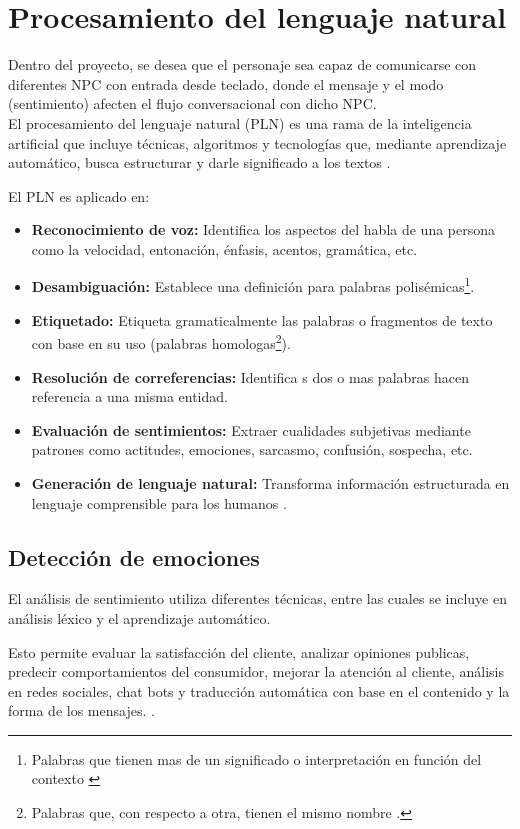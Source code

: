 \documentclass[12pt,twoside]{article}
\begin{document}
	\section{Procesamiento del lenguaje natural}
	Dentro del proyecto, se desea que el personaje sea capaz de comunicarse con diferentes NPC con entrada desde teclado, donde el mensaje y el modo (sentimiento) afecten el flujo conversacional con dicho NPC. \\
	
	El procesamiento del lenguaje natural (PLN) es una rama de la inteligencia artificial que incluye técnicas, algoritmos y tecnologías que, mediante aprendizaje automático, busca estructurar y darle significado a los textos \cite{info: pln1}.
	
	El PLN es aplicado en: 
	\begin{itemize}[noitemsep]
		\item \textbf{Reconocimiento de voz:} Identifica los aspectos del habla de una persona como la velocidad, entonación, énfasis, acentos, gramática, etc.
		\item \textbf{Desambiguación:} Establece una definición para palabras polisémicas\footnote{Palabras que tienen mas de un significado o interpretación en función del contexto \cite{info:def: polisemica}}.
		\item \textbf{Etiquetado:} Etiqueta gramaticalmente las palabras o fragmentos de texto con base en su uso (palabras homologas\footnote{Palabras que, con respecto a otra, tienen el mismo nombre \cite{info:def: homonimo}.}). 
		\item \textbf{Resolución de correferencias: } Identifica  s dos o mas palabras hacen referencia a una misma entidad.
		\item \textbf{Evaluación de sentimientos: } Extraer cualidades subjetivas mediante patrones como actitudes, emociones, sarcasmo, confusión, sospecha, etc.
		\item \textbf{Generación de lenguaje natural: } Transforma información estructurada en lenguaje comprensible para los humanos \cite{info: pln2}.
	\end{itemize}
	
	\subsection{Detección de emociones}
	El análisis de sentimiento utiliza diferentes técnicas, entre las cuales se incluye en análisis léxico y el aprendizaje automático.
	
	Esto permite evaluar la satisfacción del cliente, analizar opiniones publicas, predecir comportamientos del consumidor, mejorar la atención al cliente, análisis en redes sociales, chat bots y traducción automática con base en el contenido y la forma de los mensajes. \cite{info: pln3}.
	
\end{document}

